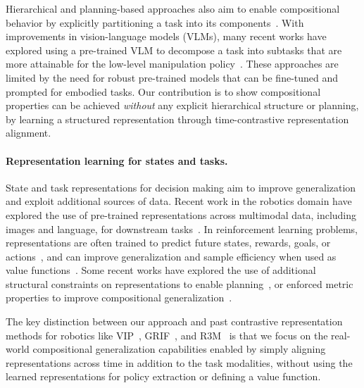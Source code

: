 Hierarchical and planning-based approaches also aim to enable compositional behavior by explicitly partitioning a task into its components~\citep{fang2022planning,myers2024policy,zhang2021c,park2023hiql}.
With improvements in vision-language models (VLMs), many recent works have explored using a pre-trained VLM to decompose a task into subtasks that are more attainable for the low-level manipulation policy~\citep{ahn2022can,attarian2022see,belkhale2024rth,kwon2023grounded,myers2024policy,singh2023progprompt,zhang2023universal}.
These approaches are limited by the need for robust pre-trained models that can be fine-tuned and prompted for embodied tasks.
Our contribution is to show compositional properties can be achieved \textit{without} any explicit hierarchical structure or planning, by learning a structured representation through time-contrastive representation alignment.

\paragraph{Representation learning for states and tasks.}State and task representations for decision making aim to improve generalization and exploit additional sources of data.
Recent work in the robotics domain have explored the use of pre-trained representations across multimodal data, including images and language, for downstream tasks~\citep{karamcheti2023languagedrivena,li2022grounded,ma2023liv,myers2023goal,nair2022r3m,pari2022surprising,shah2021rrl,cui2022can,jang2021bcz}.
In reinforcement learning problems, representations are often trained to predict future states, rewards, goals, or actions~\citep{anand2019unsupervised,ma2022vip,zhang2020learning,fan2022minedojo}, and can improve generalization and sample efficiency when used as value functions~\citep{barreto2017successor,blier2021learning,dayan1993improvinga,dosovitskiy2017learning,choi2021variational}.
Some recent works have explored the use of additional structural constraints on representations to enable planning~\citep{fang2022planning,zhang2021c,eysenbach2024inference,hafner2019learning,myers2025horizon}, or enforced metric properties to improve compositional generalization~\citep{liu2023metric,myers2024learning,wang2023optimal}.

The key distinction between our approach and past contrastive representation methods for robotics like VIP~\citep{ma2022vip}, GRIF~\citep{myers2023goal}, and R3M~\citep{nair2022r3m} is that we focus on the real-world compositional generalization capabilities enabled by simply aligning representations across time in addition to the task modalities, without using the learned representations for policy extraction or defining a value function.

